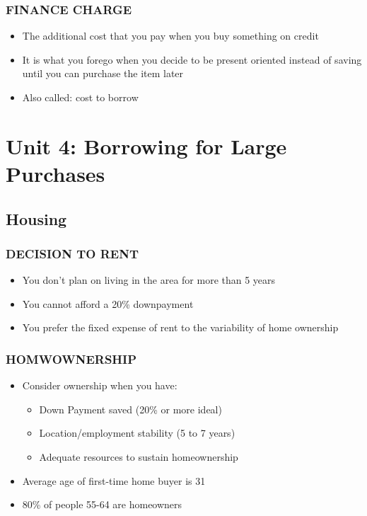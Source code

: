 \documentclass[12pt]{article}
\begin{document}
                \subsubsection{FINANCE CHARGE}
                    \begin{itemize}
                        \item The additional cost that you pay when you buy something on credit
                        \item It is what you forego when you decide to be present oriented instead of saving until you can purchase the item later
                        \item Also called: cost to borrow
                    \end{itemize}

    \section{Unit 4: Borrowing for Large Purchases}

        \subsection{Housing}
            \subsubsection{DECISION TO RENT}
                \begin{itemize}
                    \item You don't plan on living in the area for more than 5 years
                    \item You cannot afford a 20\% downpayment
                    \item You prefer the fixed expense of rent to the variability of home ownership
                \end{itemize}
            \subsubsection{HOMWOWNERSHIP}
                \begin{itemize}
                    \item Consider ownership when you have:
                        \begin{itemize}
                            \item Down Payment saved (20\% or more ideal)
                            \item Location/employment stability (5 to 7 years)
                            \item Adequate resources to sustain homeownership
                        \end{itemize}
                    \item Average age of first-time home buyer is 31
                    \item 80\% of people 55-64 are homeowners
                \end{itemize}
\end{document}
